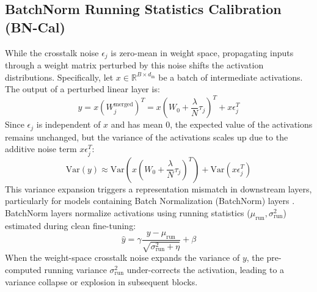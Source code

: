 \documentclass{article}
\begin{document}
\subsection{BatchNorm Running Statistics Calibration (BN-Cal)}
\label{sec:bn_cal}
While the crosstalk noise $\epsilon_j$ is zero-mean in weight space, propagating inputs through a weight matrix perturbed by this noise shifts the activation distributions. Specifically, let $x \in \mathbb{R}^{B \times d_{\text{in}}}$ be a batch of intermediate activations. The output of a perturbed linear layer is:
\begin{equation}
    y = x (W_j^{\text{merged}})^T = x (W_0 + \frac{\lambda}{N} \tau_j)^T + x \epsilon_j^T
\end{equation}
Since $\epsilon_j$ is independent of $x$ and has mean 0, the expected value of the activations remains unchanged, but the variance of the activations scales up due to the additive noise term $x \epsilon_j^T$:
\begin{equation}
    \text{Var}(y) \approx \text{Var}\left( x (W_0 + \frac{\lambda}{N} \tau_j)^T \right) + \text{Var}(x \epsilon_j^T)
\end{equation}
This variance expansion triggers a representation mismatch in downstream layers, particularly for models containing Batch Normalization (BatchNorm) layers \cite{ioffe2015batch}. BatchNorm layers normalize activations using running statistics ($\mu_{\text{run}}, \sigma^2_{\text{run}}$) estimated during clean fine-tuning:
\begin{equation}
    \hat{y} = \gamma \frac{y - \mu_{\text{run}}}{\sqrt{\sigma^2_{\text{run}} + \eta}} + \beta
\end{equation}
When the weight-space crosstalk noise expands the variance of $y$, the pre-computed running variance $\sigma^2_{\text{run}}$ under-corrects the activation, leading to a variance collapse or explosion in subsequent blocks.
\end{document}
